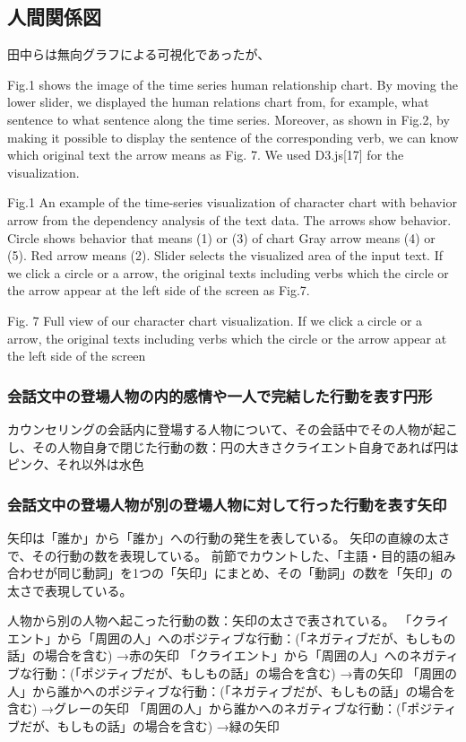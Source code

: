 \documentclass[shuuron]{kuee}
\begin{document}
\subsection{人間関係図}

田中らは無向グラフによる可視化であったが、

  Fig.1 shows the image of the time series human relationship chart. By moving the lower slider, we displayed the human relations chart from, for example, what sentence to what sentence along the time series. Moreover, as shown in Fig.2, by making it possible to display the sentence of the corresponding verb, we can know which original text the arrow means as Fig. 7. We used D3.js[17] for the visualization.


Fig.1 An example of the time-series visualization of character chart with behavior arrow from the dependency analysis of the text data. The arrows show behavior. Circle shows behavior that means (1) or (3) of chart Gray arrow means (4) or (5). Red arrow means (2). Slider selects the visualized area of the input text. If we click a circle or a arrow, the original texts including verbs which the circle or the arrow appear at the left side of the screen as Fig.7.

Fig. 7 Full view of our character chart visualization. If we click a circle or a arrow, the original texts including verbs which the circle or the arrow appear at the left side of the screen

\subsubsection{会話文中の登場人物の内的感情や一人で完結した行動を表す円形}

カウンセリングの会話内に登場する人物について、その会話中でその人物が起こし、その人物自身で閉じた行動の数：円の大きさクライエント自身であれば円はピンク、それ以外は水色


\subsubsection{会話文中の登場人物が別の登場人物に対して行った行動を表す矢印}

矢印は「誰か」から「誰か」への行動の発生を表している。
矢印の直線の太さで、その行動の数を表現している。
前節でカウントした、「主語・目的語の組み合わせが同じ動詞」を1つの「矢印」にまとめ、その「動詞」の数を「矢印」の太さで表現している。

人物から別の人物へ起こった行動の数：矢印の太さで表されている。
「クライエント」から「周囲の人」へのポジティブな行動：(「ネガティブだが、もしもの話」の場合を含む)
→赤の矢印
「クライエント」から「周囲の人」へのネガティブな行動：(「ポジティブだが、もしもの話」の場合を含む)
→青の矢印
「周囲の人」から誰かへのポジティブな行動：(「ネガティブだが、もしもの話」の場合を含む)
→グレーの矢印
「周囲の人」から誰かへのネガティブな行動：(「ポジティブだが、もしもの話」の場合を含む)
→緑の矢印
\end{document}
